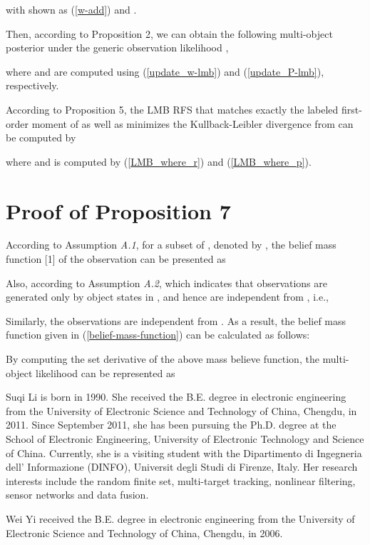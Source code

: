 \documentclass[journal]{IEEEtran}
\begin{document}
{with   shown as (\ref{w-add}) and .


Then, according to Proposition 2,   we can obtain the following multi-object posterior under the generic observation likelihood ,

where   and  are computed  using (\ref{update_w-lmb}) and (\ref{update_P-lmb}), respectively.

According to Proposition 5, the LMB RFS that matches exactly the labeled first-order moment of  as well as minimizes the Kullback-Leibler divergence  from   can be computed by
 
where  and  is computed by (\ref{LMB_where_r}) and (\ref{LMB_where_p}).
\section{Proof of Proposition 7}
According to Assumption \textit{A.1}, for a subset of , denoted by , the belief mass function [1] of the observation  can be presented as


Also, according to Assumption \textit{A.2},   which indicates that  observations  are generated only by object states in , and hence are independent from , i.e.,

Similarly, the observations  are independent from . 
As a result, the belief mass function given in (\ref{belief-mass-function}) can be calculated  as follows:


By computing the set derivative of the above mass believe function, the multi-object likelihood can be represented as 






\begin{IEEEbiography}
{Suqi Li}  is born in 1990.  She received the B.E. degree in electronic engineering from the University of Electronic Science and Technology of China, Chengdu, in 2011. 
Since September 2011, she has been pursuing the Ph.D. degree at the School of Electronic Engineering, University of Electronic Technology and Science of China.  
Currently, she is a visiting student with the Dipartimento di Ingegneria dell' Informazione (DINFO), Universit degli Studi di Firenze, Italy. Her research interests include the random finite set, multi-target tracking, nonlinear filtering, sensor networks and data fusion. 
\end{IEEEbiography}
 \begin{IEEEbiography}
{Wei Yi}
 received the B.E. degree in electronic engineering from the University of Electronic Science and Technology of China, Chengdu, in 2006.


\end{IEEEbiography}}
\end{document}
